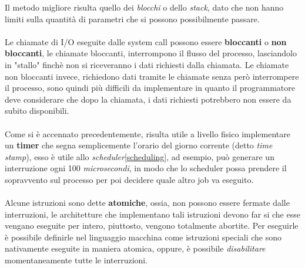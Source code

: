 \documentclass[12pt, letterpaper]{article}
\begin{document}
Il metodo migliore risulta quello dei \textit{blocchi} o dello \textit{stack}, dato che non hanno limiti sulla 
quantità di parametri che si possono possibilmente passare.\\\hphantom{.}\\
Le chiamate di I/O eseguite dalle system call possono essere \textbf{bloccanti} o \textbf{non bloccanti},
le chiamate bloccanti, interrompono il flusso del processo, lasciandolo in "stallo" finchè non si
riceveranno i dati richiesti dalla chiamata. Le chiamate non bloccanti invece, richiedono dati tramite 
le chiamate senza però interrompere il processo, sono quindi più difficili da implementare in quanto 
il programmatore deve considerare che dopo la chiamata, i dati richiesti potrebbero non essere 
da subito disponibili.\\\hphantom{.}\\
Come si è accennato precedentemente, risulta utile a livello fisico implementare un \textbf{timer} che 
segna semplicemente l'orario del giorno corrente (detto \textit{time stamp}), esso è utile allo 
\textit{scheduler}\ref{scheduling}, ad esempio, può generare un interruzione ogni 100 \textit{microsecondi}, in modo che 
lo scheduler possa prendere il sopravvento sul processo per poi decidere quale altro job va eseguito.\\\hphantom{.}\\
Alcune istruzioni sono dette \textbf{atomiche}, ossia, non possono essere fermate dalle interruzioni, le architetture 
che implementano tali istruzioni devono far si che esse vengano eseguite per intero, piuttosto, vengono
totalmente abortite. Per eseguirle è possibile definirle nel linguaggio macchina come istruzioni speciali 
che sono nativamente eseguite in maniera atomica, oppure, è possibile \textit{disabilitare} momentaneamente 
tutte le interruzioni.
\end{document}
